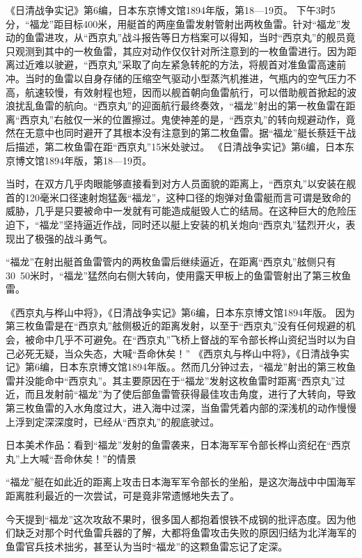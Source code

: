 \documentclass[12pt,UTF8]{ctexbook}
\begin{document}
《日清战争实记》第6编，日本东京博文馆1894年版，第18—19页。
下午3时5分，“福龙”距目标400米，用艇首的两座鱼雷发射管射出两枚鱼雷。针对“福龙”发动的鱼雷进攻，从“西京丸”战斗报告等日方档案可以得知，当时“西京丸”的舰员竟只观测到其中的一枚鱼雷，其应对动作仅仅针对所注意到的一枚鱼雷进行。因为距离过近难以驶避，“西京丸”采取了向左紧急转舵的方法，将舰首对准鱼雷高速前冲。当时的鱼雷以自身存储的压缩空气驱动小型蒸汽机推进，气瓶内的空气压力不高，航速较慢，有效射程也短，因而以舰首朝向鱼雷航行，可以借助舰首掀起的波浪扰乱鱼雷的航向。“西京丸”的迎面航行最终奏效，“福龙”射出的第一枚鱼雷在距离“西京丸”右舷仅一米的位置擦过。鬼使神差的是，“西京丸”的转向规避动作，竟然在无意中也同时避开了其根本没有注意到的第二枚鱼雷。据“福龙”艇长蔡廷干战后描述，第二枚鱼雷在距“西京丸”15米处驶过。 《日清战争实记》第6编，日本东京博文馆1894年版，第18—19页。

当时，在双方几乎肉眼能够直接看到对方人员面貌的距离上，“西京丸”以安装在舰首的120毫米口径速射炮猛轰“福龙”，这种口径的炮弹对鱼雷艇而言可谓是致命的威胁，几乎是只要被命中一发就有可能造成艇毁人亡的结局。在这种巨大的危险压迫下，“福龙”坚持逼近作战，同时还以艇上安装的机关炮向“西京丸”猛烈开火，表现出了极强的战斗勇气。

“福龙”在射出艇首鱼雷管内的两枚鱼雷后继续逼近，在距离“西京丸”舷侧只有30~50米时，“福龙”猛然向右侧大转向，使用露天甲板上的鱼雷管射出了第三枚鱼雷。

《西京丸与桦山中将》，《日清战争实记》第6编，日本东京博文馆1894年版。
因为第三枚鱼雷是在“西京丸”舷侧极近的距离发射，以至于“西京丸”没有任何规避的机会，被命中几乎不可避免。在“西京丸”飞桥上督战的军令部长桦山资纪当时以为自己必死无疑，当众失态，大喊“吾命休矣！” 《西京丸与桦山中将》，《日清战争实记》第6编，日本东京博文馆1894年版。。然而几分钟过去，“福龙”射出的第三枚鱼雷并没能命中“西京丸”。其主要原因在于“福龙”发射这枚鱼雷时距离“西京丸”过近，而且发射前“福龙”为了使后部鱼雷管获得最佳攻击角度，进行了大转向，导致第三枚鱼雷的入水角度过大，进入海中过深，当鱼雷凭着内部的深浅机的动作慢慢上浮到定深深度时，已经从“西京丸”的舰底驶过。


日本美术作品：看到“福龙”发射的鱼雷袭来，日本海军军令部长桦山资纪在“西京丸”上大喊“吾命休矣！”的情景

“福龙”艇在如此近的距离上攻击日本海军军令部长的坐船，是这次海战中中国海军距离胜利最近的一次尝试，可是竟非常遗憾地失去了。

今天提到“福龙”这次攻敌不果时，很多国人都抱着恨铁不成钢的批评态度。因为他们缺乏对那个时代鱼雷兵器的了解，大都将鱼雷攻击失败的原因归结为北洋海军的鱼雷官兵技术拙劣，甚至认为当时“福龙”的这颗鱼雷忘记了定深。
\end{document}
